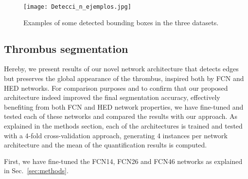 \documentclass[preprint,authoryear,12pt]{elsarticle}
\begin{document}
\begin{figure}[htb]
\centering
\texttt{[image: Detecci\_n\_ejemplos.jpg]}
\caption{\label{fig:det_res} Examples of some detected bounding boxes in the three datasets.}
\end{figure}



\subsection{Thrombus segmentation}
Hereby, we present results of our novel network architecture that detects edges but preserves the global appearance of the thrombus, inspired both by FCN and HED networks. For comparison purposes and to confirm that our proposed architecture indeed improved the final segmentation accuracy, effectively benefiting from both FCN and HED network properties, we have fine-tuned and tested each of these networks and compared the results with our approach. As explained in the methods section, each of the architectures is trained and tested with a 4-fold cross-validation approach, generating 4 instances per network architecture and the mean of the quantification results is computed.\par 

First, we have fine-tuned the FCN14, FCN26 and FCN46 networks as explained in Sec.~\ref{sec:methods}. %

\end{document}
